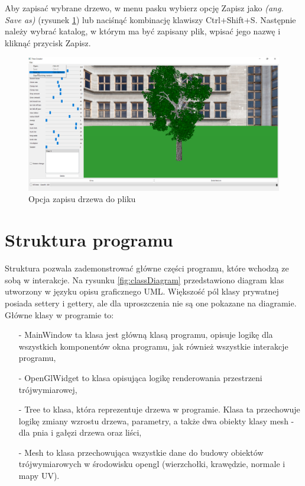 \documentclass[a4paper,12pt,twoside]{book} %
\begin{document}
Aby zapisać wybrane drzewo, w menu pasku wybierz opcję Zapisz 
jako \textit{(ang. Save as)} (rysunek \ref{fig:saveTree}) lub naciśnąć kombinację klawiszy Ctrl+Shift+S. 
Następnie należy wybrać katalog, w którym ma być zapisany plik, 
wpisać jego nazwę i kliknąć przycisk Zapisz.

\begin{figure}[H]
	\centering\includegraphics[width=15.5cm]{grafika/program/saveTree.png}
	\caption{Opcja zapisu drzewa do pliku}
    \label{fig:saveTree}
\end{figure}


\section{Struktura programu}

Struktura pozwala zademonstrować główne części programu, 
które wchodzą ze sobą w interakcje. Na rysunku \ref{fig:classDiagram} 
przedstawiono diagram klas utworzony w języku opisu graficznego UML. 
Większość pól klasy prywatnej posiada settery i gettery, 
ale dla uproszczenia nie są one pokazane na diagramie. 
Główne klasy w programie to:
\begin{itemize}
	\item[-] MainWindow ta klasa jest główną klasą programu, opisuje logikę dla wszystkich komponentów okna programu, jak również wszystkie interakcje programu,
	\item[-] OpenGlWidget to klasa opisująca logikę renderowania przestrzeni trójwymiarowej,
	\item[-] Tree to klasa, która reprezentuje drzewa w programie. Klasa ta przechowuje logikę zmiany wzrostu drzewa, parametry, a także dwa obiekty klasy mesh - dla pnia i gałęzi drzewa oraz liści,
	\item[-] Mesh to klasa przechowująca wszystkie dane do budowy obiektów trójwymiarowych w środowisku opengl (wierzchołki, krawędzie, normale i mapy UV).
\end{itemize}
\end{document}
